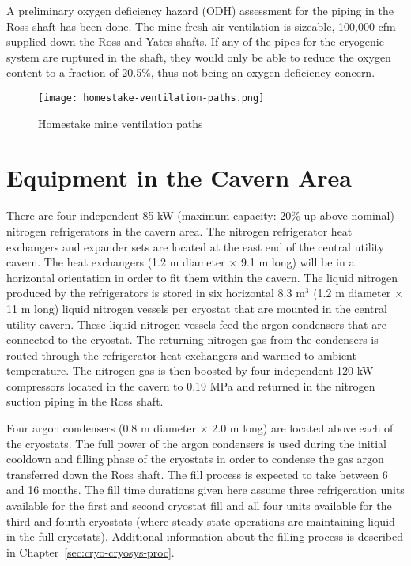 A preliminary oxygen deficiency hazard (ODH) assessment for 
the piping in the Ross shaft has been done. The mine fresh 
air ventilation is sizeable, 100,000 cfm supplied down the 
Ross and Yates shafts. If any of the pipes for the cryogenic 
system are ruptured in the shaft, they would only be able 
to reduce the oxygen content to a fraction of 20.5\%, 
thus not being an oxygen deficiency concern.

\begin{figure}[htbp]
\centering
\texttt{[image: homestake-ventilation-paths.png]} 
\caption{Homestake mine ventilation paths}
\label{fig:ventilation-paths}
\end{figure}


\chapter{Equipment in the Cavern Area}
\label{sec:cryo-cryosys-equip-cavern}

There are four independent 85 kW (maximum capacity: 20\% up above nominal) 
nitrogen refrigerators in the cavern area. The nitrogen
refrigerator heat exchangers and expander sets are located 
at the east end of the central utility cavern.
The heat exchangers (1.2 m diameter $\times$ 9.1 m long) 
will be in a horizontal orientation in order to
fit them within the cavern. The liquid nitrogen produced 
by the refrigerators is stored in six horizontal 
8.3 m$^3$ (1.2 m diameter $\times$ 11 m long) liquid 
nitrogen vessels per cryostat that are mounted in the
central utility cavern. These liquid nitrogen vessels
feed the argon condensers that are connected 
to the cryostat. The returning nitrogen gas from the 
condensers is routed through the refrigerator heat 
exchangers and warmed to ambient temperature. The 
nitrogen gas is then boosted by four independent 120 kW 
compressors located in the cavern to 0.19 MPa 
and returned in the nitrogen suction piping 
in the Ross shaft.

Four argon condensers (0.8 m diameter $\times$ 2.0 m long) 
are located above each of the cryostats. The full 
power of the argon condensers is used during the initial 
cooldown and filling phase of the cryostats in order to
condense the gas argon transferred down the Ross 
shaft. The fill process is expected to take between 6 and 16 months. 
The fill time durations given here assume three refrigeration 
units available for the first and second cryostat fill and
all four units available for the third and fourth cryostats (where
steady state operations are maintaining liquid in the full cryostats).
Additional information about the filling process is 
described in Chapter~\ref{sec:cryo-cryosys-proc}.  

